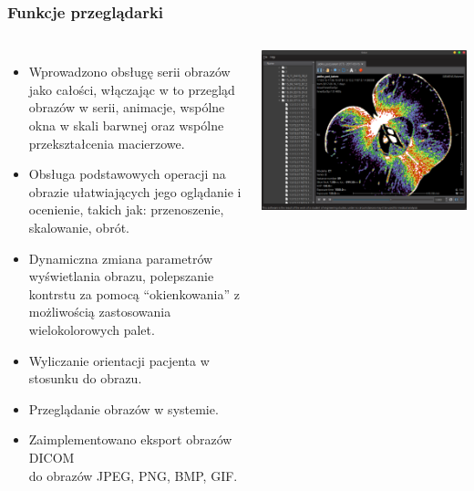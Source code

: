 \documentclass[aspectratio=169]{beamer}
\begin{document}
\begin{frame}[t]
    \frametitle{Funkcje przeglądarki}
    \begin{columns}[T]
        \vspace{-1em}
        \footnotesize
        \begin{itemize}
            \item Wprowadzono obsługę serii obrazów jako całości, włączając w to przegląd obrazów w serii, animacje, wspólne okna w skali barwnej oraz wspólne przekształcenia macierzowe.
            \item Obsługa podstawowych operacji na obrazie ułatwiających jego oglądanie i ocenienie, takich jak: przenoszenie, skalowanie, obrót.
            \item Dynamiczna zmiana parametrów wyświetlania obrazu, polepszanie kontrstu za pomocą \enquote{okienkowania} z możliwością zastosowania wielokolorowych palet.
            \item Wyliczanie orientacji pacjenta w stosunku do obrazu.
            \item Przeglądanie obrazów w systemie.
            \item Zaimplementowano eksport obrazów DICOM\\ do obrazów JPEG, PNG, BMP, GIF.
        \end{itemize}

        \includegraphics[width=\textwidth]{img/test004.png}
    \end{columns}
\end{frame}
\end{document}

